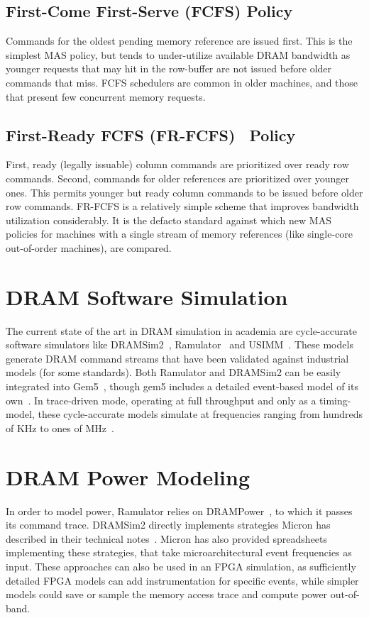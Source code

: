 \subsection{First-Come First-Serve (FCFS) Policy}\label{fcfs} Commands for the
oldest pending memory reference are issued first. This is the simplest MAS
policy, but tends to under-utilize available DRAM bandwidth as younger requests
that may hit in the row-buffer are not issued before older commands that miss.
FCFS schedulers are common in older machines, and those that present few
concurrent memory requests.

\subsection{First-Ready FCFS (FR-FCFS)~\cite{frfcfs} Policy}\label{frfcfs}
First, ready (legally issuable) column commands are prioritized over ready row
commands. Second, commands for older references are prioritized over younger
ones. This permits younger but ready column commands to be issued before older
row commands. FR-FCFS is a relatively simple scheme that improves bandwidth
utilization considerably. It is the defacto standard against which new MAS
policies for machines with a single stream of memory references (like
single-core out-of-order machines), are compared.

\section{DRAM Software Simulation}

The current state of the art in DRAM simulation in academia are cycle-accurate
software simulators like DRAMSim2~\cite{dramsim}, Ramulator~\cite{ramulator} and
USIMM~\cite{usimm}. These models generate DRAM command streams that have been
validated against industrial models (for some standards). Both Ramulator and
DRAMSim2 can be easily integrated into Gem5~\cite{gem5}, though gem5 includes a
detailed event-based model of its own~\cite{gem5event}. In trace-driven mode,
operating at full throughput and only as a timing-model, these cycle-accurate
models simulate at frequencies ranging from hundreds of KHz to ones of
MHz~\cite{ramulator}.

\section{DRAM Power Modeling}

In order to model power, Ramulator relies on DRAMPower~\cite{drampower}, to
which it passes its command trace. DRAMSim2 directly implements strategies
Micron has described in their technical notes~\cite{micronpower}. Micron has
also provided spreadsheets implementing these strategies, that take
microarchitectural event frequencies as input. These approaches can also be
used in an FPGA simulation, as sufficiently detailed FPGA models can add
instrumentation for specific events, while simpler models could save or sample
the memory access trace and compute power out-of-band.
